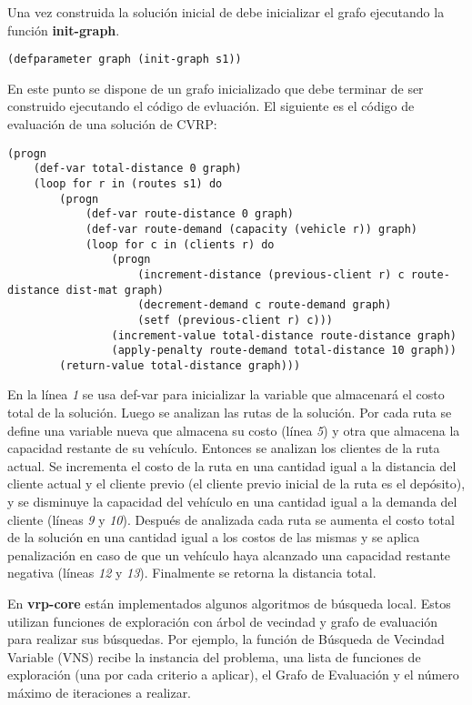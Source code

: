 Una vez construida la solución inicial de debe inicializar el grafo ejecutando la función \textbf{init-graph}.

\begin{lstlisting}
(defparameter graph (init-graph s1))
\end{lstlisting}

En este punto se dispone de un grafo inicializado que debe terminar de ser construido ejecutando el código de evluación. El siguiente es el código de evaluación de una solución de CVRP:

\begin{lstlisting}
(progn
	(def-var total-distance 0 graph)
	(loop for r in (routes s1) do 
		(progn
			(def-var route-distance 0 graph)
			(def-var route-demand (capacity (vehicle r)) graph) 
			(loop for c in (clients r) do 
				(progn
					(increment-distance (previous-client r) c route-distance dist-mat graph)
					(decrement-demand c route-demand graph) 
					(setf (previous-client r) c)))
				(increment-value total-distance route-distance graph)
				(apply-penalty route-demand total-distance 10 graph)) 
		(return-value total-distance graph)))

\end{lstlisting}

En la línea \textit{1} se usa def-var para inicializar la variable que almacenará el costo total de la solución. Luego se analizan las rutas de la solución. Por cada ruta se define una variable nueva que almacena su costo (línea \textit{5}) y otra que almacena la capacidad restante de su vehículo. Entonces se analizan los clientes de la ruta actual. Se incrementa el costo de la ruta en una cantidad igual a la distancia del cliente actual y el cliente previo (el cliente previo inicial de la ruta es el depósito), y se disminuye la capacidad del vehículo en una cantidad igual a la demanda del cliente (líneas \textit{9} y \textit{10}). Después de analizada cada ruta se aumenta el costo total de la solución en una cantidad igual a los costos de las mismas y se aplica penalización en caso de que un vehículo haya alcanzado una capacidad restante negativa (líneas \textit{12} y \textit{13}). Finalmente se retorna la distancia total.

En \textbf{vrp-core} están implementados algunos algoritmos de búsqueda local. Estos utilizan funciones de exploración con árbol de vecindad y grafo de evaluación para realizar sus búsquedas. Por ejemplo, la función de Búsqueda de Vecindad Variable \cite{TODO} (VNS) recibe la instancia del problema, una lista de funciones de exploración (una por cada criterio a aplicar), el Grafo de Evaluación y el número máximo de iteraciones a realizar.

